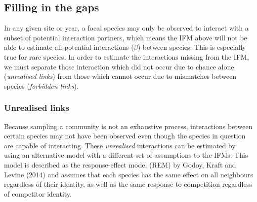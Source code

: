 \documentclass[a4,12pt]{article}
\begin{document}
    \subsection{Filling in the gaps}
        
        In any given site or year, a focal species may only be observed to interact with a subset of potential interaction partners, which means the IFM above will not be able to estimate all potential interactions ($\beta$) between species. This is especially true for rare species. In order to estimate the interactions missing from the IFM, we must separate those interaction which did not occur due to chance alone (\textit{unrealised links}) from those which cannot occur due to mismatches between species (\textit{forbidden links}). 
        
        
        

    \subsubsection{Unrealised links}
        
        Because sampling a community is not an exhaustive process, interactions between certain species may not have been observed even though the species in question are capable of interacting. These \textit{unrealised} interactions can be estimated by using an alternative model with a different set of assumptions to the IFMs. This model is described as the response-effect model (REM) by Godoy, Kraft and Levine (2014) and assumes that each species has the same effect on all neighbours regardless of their identity, as well as the same response to competition regardless of competitor identity. 
        
\end{document}
